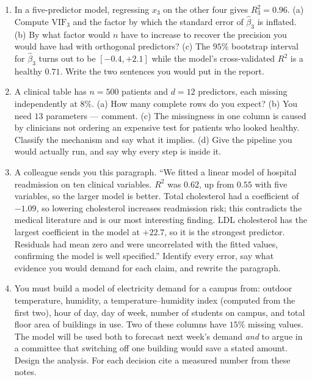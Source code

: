 \documentclass[11pt]{article}
\begin{document}
\begin{enumerate}[leftmargin=*]
  \item\label{q:vif} In a five-predictor model, regressing $x_3$ on the other
    four gives $R_3^2 = 0.96$. (a) Compute $\mathrm{VIF}_3$ and the factor by
    which the standard error of $\hat\beta_3$ is inflated. (b) By what factor
    would $n$ have to increase to recover the precision you would have had
    with orthogonal predictors? (c) The $95\%$ bootstrap interval for
    $\hat\beta_3$ turns out to be $[-0.4, +2.1]$ while the model's
    cross-validated $R^2$ is a healthy $0.71$. Write the two sentences you
    would put in the report.

  \item\label{q:missing} A clinical table has $n = 500$ patients and $d = 12$
    predictors, each missing independently at $8\%$. (a) How many complete
    rows do you expect? (b) You need $13$ parameters --- comment. (c) The
    missingness in one column is caused by clinicians not ordering an
    expensive test for patients who looked healthy. Classify the mechanism
    and say what it implies. (d) Give the pipeline you would actually run,
    and say why every step is inside it.

  \item\label{q:report} A colleague sends you this paragraph. ``We fitted a
    linear model of hospital readmission on ten clinical variables. $R^2$ was
    $0.62$, up from $0.55$ with five variables, so the larger model is
    better. Total cholesterol had a coefficient of $-1.09$, so lowering
    cholesterol increases readmission risk; this contradicts the medical
    literature and is our most interesting finding. LDL cholesterol has the
    largest coefficient in the model at $+22.7$, so it is the strongest
    predictor. Residuals had mean zero and were uncorrelated with the fitted
    values, confirming the model is well specified.'' Identify every error,
    say what evidence you would demand for each claim, and rewrite the
    paragraph.

  \item\label{q:design} You must build a model of electricity demand for a
    campus from: outdoor temperature, humidity, a temperature--humidity
    index (computed from the first two), hour of day, day of week, number of
    students on campus, and total floor area of buildings in use. Two of
    these columns have $15\%$ missing values. The model will be used both to
    forecast next week's demand \emph{and} to argue in a committee that
    switching off one building would save a stated amount. Design the
    analysis. For each decision cite a measured number from these notes.
\end{enumerate}
\end{document}
